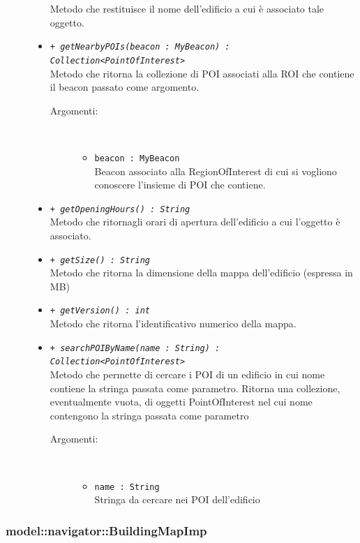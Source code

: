 \documentclass[../DefinizioneDiProdotto.tex]{subfiles}
\begin{document}
\begin{description}
\begin{itemize}
Metodo che restituisce il nome dell'edificio a cui è associato tale oggetto.
 \item \texttt{+ \textit{getNearbyPOIs(beacon : MyBeacon) : Collection<PointOfInterest>}}\\
Metodo che ritorna la collezione di POI associati alla ROI che contiene il beacon passato come argomento.
 \begin{description}
\item[Argomenti:] \
\begin{itemize}
\item \texttt{beacon : MyBeacon}\\
Beacon associato alla RegionOfInterest di cui si vogliono conoscere l'insieme di POI che contiene.\end{itemize}
\end{description}
\item \texttt{+ \textit{getOpeningHours() : String}}\\
Metodo che ritornagli orari di apertura dell'edificio a cui l'oggetto è associato.
 \item \texttt{+ \textit{getSize() : String}}\\
Metodo che ritorna la dimensione della mappa dell'edificio (espressa in MB)
 \item \texttt{+ \textit{getVersion() : int}}\\
Metodo che ritorna l'identificativo numerico della mappa.
 \item \texttt{+ \textit{searchPOIByName(name : String) : Collection<PointOfInterest>}}\\
Metodo che permette di cercare i POI di un edificio in cui nome contiene la stringa passata come parametro. Ritorna una collezione, eventualmente vuota,  di oggetti PointOfInterest nel cui nome contengono la stringa passata come parametro
 \begin{description}
\item[Argomenti:] \
\begin{itemize}
\item \texttt{name : String}\\
Stringa da cercare nei POI dell'edificio\end{itemize}
\end{description}
\end{itemize}
\end{description}

\subsubsection{model::navigator::BuildingMapImp}
\end{document}
